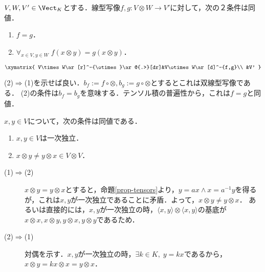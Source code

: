 \documentclass[uplatex, dvipdfmx]{jsreport}
\begin{document}
\begin{proposition}[単純テンソルの行き先が定まればテンソル積からの線型写像が定まる]\label{prop-linear-map-from-tensor-product-is-determined-by-basis-destination}
    $V,W,V'\in\Vect_K$とする．線型写像$f,g:V\otimes W\to V'$に対して，次の２条件は同値．
    \begin{enumerate}
        \item $f=g$．
        \item $\forall_{x\in V,y\in W}\;f(x\otimes y)=g(x\otimes y)$．
    \end{enumerate}
    \[\xymatrix{
        V\times W\ar[r]^-{\otimes}\ar@{.>}[dr]&V\otimes W\ar[d]^-{f,g}\\
        &V'
    }\]
\end{proposition}
\begin{Proof}
    (2)$\Rightarrow$(1)を示せば良い．$b_f:=f\circ\otimes,b_g:=g\circ\otimes$とするとこれは双線型写像である．
    (2)の条件は$b_f=b_g$を意味する．テンソル積の普遍性から，これは$f=g$と同値．
\end{Proof}

\begin{proposition}[テンソルの非可換条件]
    $x,y\in V$について，次の条件は同値である．
    \begin{enumerate}
        \item $x,y\in V$は一次独立．
        \item $x\otimes y\ne y\otimes x\in V\otimes V$．
    \end{enumerate}
\end{proposition}
\begin{Proof}\mbox{}
    \begin{description}
        \item[(1)$\Rightarrow$(2)] $x\otimes y=y\otimes x$とすると，命題\ref{prop-tensors}より，$y=ax\land x=a^{-1}y$を得るが，これは$x,y$が一次独立であることに矛盾．よって，$x\otimes y\ne y\otimes x$．
        あるいは直接的には，$x,y$が一次独立の時，$\langle x,y\rangle\otimes\langle x,y\rangle$の基底が$x\otimes x,x\otimes y,y\otimes x,y\otimes y$であるため．
        \item[(2)$\Rightarrow$(1)] 対偶を示す．$x,y$が一次独立の時，$\exists k\in K,\; y=kx$であるから，$x\otimes y=kx\otimes x=y\otimes x$．
    \end{description}
\end{Proof}
\end{document}
